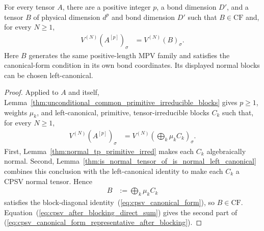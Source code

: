 \begin{lemma}
    \label{thm:cpsv_canonical_form_representative_after_blocking}
    \leanok
    For every tensor $A$, there are a positive integer $p$, a bond dimension
    $D'$, and a tensor $B$ of physical dimension $d^p$ and bond dimension
    $D'$ such that $B\in\mathrm{CF}$ and, for every $N\ge1$,
    \begin{align}
        V^{(N)}(A^{[p]})_\sigma
         & =V^{(N)}(B)_\sigma.
        \label{eq:cpsv_canonical_form_representative_after_blocking}
    \end{align}
    Here $B$ generates the same positive-length MPV family and satisfies the
    canonical-form condition in its own bond coordinates. Its displayed
    normal blocks can be chosen left-canonical.
\end{lemma}

\begin{proof}\leanok
    Applied to $A$ and itself,
    Lemma~\ref{thm:unconditional_common_primitive_irreducible_blocks} gives
    $p\ge1$, weights $\mu_k$, and left-canonical, primitive,
    tensor-irreducible blocks $C_k$ such that, for every $N\ge1$,
    \begin{align}
        V^{(N)}(A^{[p]})_\sigma
         & =V^{(N)}\!\left(\bigoplus_k\mu_kC_k\right)_\sigma.
        \label{eq:cpsv_after_blocking_direct_sum}
    \end{align}
    First, Lemma~\ref{thm:normal_tp_primitive_irred} makes each $C_k$
    algebraically normal. Second,
    Lemma~\ref{thm:is_normal_tensor_of_is_normal_left_canonical} combines
    this conclusion with the left-canonical identity to make each $C_k$ a CPSV
    normal tensor. Hence
    \begin{align}
        B
         & :=\bigoplus_k\mu_kC_k
        \label{eq:cpsv_after_blocking_representative}
    \end{align}
    satisfies the block-diagonal identity~(\ref{eq:cpsv_canonical_form}),
    so $B\in\mathrm{CF}$. Equation~(\ref{eq:cpsv_after_blocking_direct_sum})
    gives the second part of
    (\ref{eq:cpsv_canonical_form_representative_after_blocking}).
\end{proof}

